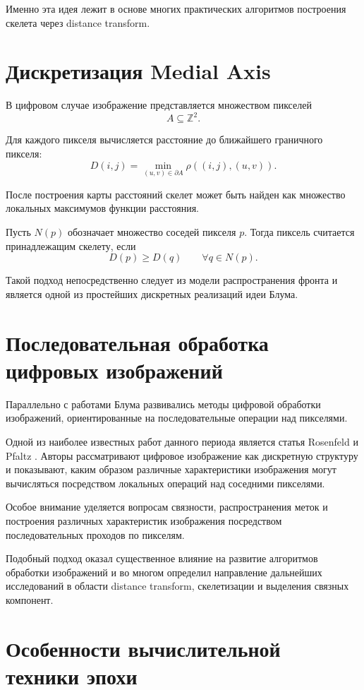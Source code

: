 \documentclass[12pt,a4paper]{article}
\begin{document}
Именно эта идея лежит в основе многих практических алгоритмов построения скелета через distance transform.

\section{Дискретизация Medial Axis}

В цифровом случае изображение представляется множеством пикселей
\[
A\subseteq \mathbb{Z}^2.
\]

Для каждого пикселя вычисляется расстояние до ближайшего граничного пикселя:
\[
D(i,j)
=
\min_{(u,v)\in \partial A}
\rho((i,j),(u,v)).
\]

После построения карты расстояний скелет может быть найден как множество локальных максимумов функции расстояния.

Пусть $N(p)$ обозначает множество соседей пикселя $p$. Тогда пиксель считается принадлежащим скелету, если
\[
D(p)
\ge
D(q)
\qquad
\forall q\in N(p).
\]

Такой подход непосредственно следует из модели распространения фронта и является одной из простейших дискретных реализаций идеи Блума.

\section{Последовательная обработка цифровых изображений}

Параллельно с работами Блума развивались методы цифровой обработки изображений, ориентированные на последовательные операции над пикселями.

Одной из наиболее известных работ данного периода является статья Rosenfeld и Pfaltz \cite{pfaltz1966}. Авторы рассматривают цифровое изображение как дискретную структуру и показывают, каким образом различные характеристики изображения могут вычисляться посредством локальных операций над соседними пикселями.

Особое внимание уделяется вопросам связности, распространения меток и построения различных характеристик изображения посредством последовательных проходов по пикселям.

Подобный подход оказал существенное влияние на развитие алгоритмов обработки изображений и во многом определил направление дальнейших исследований в области distance transform, скелетизации и выделения связных компонент.

\section{Особенности вычислительной техники эпохи}
\end{document}
